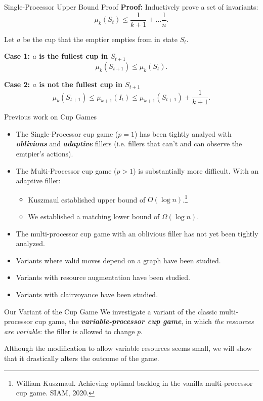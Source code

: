 \documentclass[xcolor=x11names, svgnames, rgb]{beamer}
\newcommand{\defn}[1]       {{\textit{\textbf{\boldmath #1}}}}
\begin{document}
\begin{frame}[t]{Single-Processor Upper Bound Proof}
  \textbf{Proof:}
  Inductively prove a set of invariants: 
    $$\mu_k(S_t) \le \frac{1}{k+1} + \ldots \frac{1}{n}.$$

  \vspace{0.25cm}
  Let $a$ be the cup that the emptier empties from in state $S_{t}$.

  \vspace{0.25cm}
  \textbf{Case 1: $a$ is the fullest cup in $S_{t+1}$}\\
  $$\mu_k(S_{t+1}) \le \mu_k(S_t).$$

  \vspace{0.25cm}
  \textbf{Case 2: $a$ is not the fullest cup in $S_{t+1}$}
  $$\mu_k(S_{t+1}) \le \mu_{k+1}(I_t) \le \mu_{k+1}(S_{t+1}) + \frac{1}{k+1}.$$
\end{frame}

\begin{frame}[t]{Previous work on Cup Games}
  \begin{itemize}
    \item The Single-Processor cup game ($p=1$) has been tightly analyed with
      \defn{oblivious} and \defn{adaptive} fillers (i.e. fillers that can't and
      can observe the emtpier's actions).
    \item The Multi-Processor cup game ($p>1$) is substantially more difficult. With an adaptive filler:
      \begin{itemize}
        \item Kuszmaul established upper bound of $O(\log n)$.\footnote{\tiny\color{blue}William Kuszmaul. Achieving optimal backlog in the vanilla multi-processor cup game. SIAM, 2020.}
        \item We established a matching lower bound of $\Omega(\log n)$.
      \end{itemize}
    \item The multi-processor cup game with an oblivious filler has not yet
      been tightly analyzed.
    \item Variants where valid moves depend on a graph have been studied.
    \item Variants with resource augmentation have been studied.
    \item Variants with clairvoyance have been studied.
  \end{itemize}
\end{frame}

\begin{frame}[t]{Our Variant of the Cup Game}
We investigate a variant of the classic multi-processor cup game,
the \defn{variable-processor cup game}, in which \emph{the resources are variable}:
the filler is allowed to change $p$.

\vspace{1cm}
Although the modification to allow variable resources seems small, we will
show that it drastically alters the outcome of the game.
\end{frame}
\end{document}
